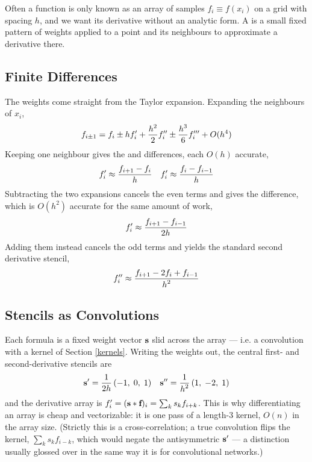 Often a function is only known as an array of samples $f_i \equiv f(x_i)$ on a
grid with spacing $h$, and we want its derivative without an analytic form. A
 is a small fixed pattern of weights applied to a point and its
neighbours to approximate a derivative there.

\subsection{Finite Differences}
The weights come straight from the Taylor expansion. Expanding the neighbours of
$x_i$,
\begin{align}
    f_{i\pm 1} = f_i \pm h f_i' + \frac{\displaystyle h^2}{\displaystyle 2} f_i'' \pm \frac{\displaystyle h^3}{\displaystyle 6} f_i''' + O(h^4)
\end{align}
Keeping one neighbour gives the  and  differences, each
$O(h)$ accurate,
\begin{align}
    f_i' \approx \frac{\displaystyle f_{i+1} - f_i}{\displaystyle h} && f_i' \approx \frac{\displaystyle f_i - f_{i-1}}{\displaystyle h}
\end{align}
Subtracting the two expansions cancels the even terms and gives the 
difference, which is $O(h^2)$ accurate for the same amount of work,
\begin{align}\label{eq:central-diff}
    f_i' \approx \frac{\displaystyle f_{i+1} - f_{i-1}}{\displaystyle 2h}
\end{align}
Adding them instead cancels the odd terms and yields the standard second
derivative stencil,
\begin{align}\label{eq:second-diff}
    f_i'' \approx \frac{\displaystyle f_{i+1} - 2f_i + f_{i-1}}{\displaystyle h^2}
\end{align}

\subsection{Stencils as Convolutions}
Each formula is a fixed weight vector $\textbf{s}$ slid across the array --- i.e. a
convolution with a kernel of Section \ref{kernels}. Writing the weights out, the
central first- and second-derivative stencils are
\begin{align}
    \textbf{s}' = \frac{\displaystyle 1}{\displaystyle 2h}\,(-1,\;0,\;1) && \textbf{s}'' = \frac{\displaystyle 1}{\displaystyle h^2}\,(1,\;-2,\;1)
\end{align}
and the derivative array is $f'_i = (\textbf{s} * \textbf{f})_i = \sum_k s_k f_{i+k}$. This
is why differentiating an array is cheap and vectorizable: it is one pass of a
length-3 kernel, $O(n)$ in the array size. (Strictly this is a cross-correlation;
a true convolution flips the kernel, $\sum_k s_k f_{i-k}$, which would negate the
antisymmetric $\textbf{s}'$ --- a distinction usually glossed over in the same way it
is for convolutional networks.)

